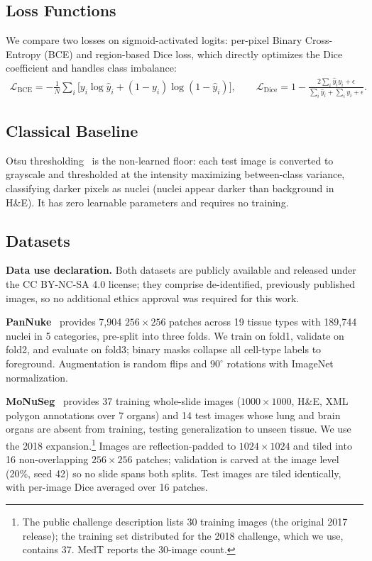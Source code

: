 \documentclass[runningheads]{llncs}
\begin{document}
\subsection{Loss Functions}

We compare two losses on sigmoid-activated logits: per-pixel Binary Cross-Entropy (BCE) and region-based Dice loss, which directly optimizes the Dice coefficient and handles class imbalance:
\begin{align*}
\mathcal{L}_{\text{BCE}} = -\tfrac{1}{N}\textstyle\sum_i \big[y_i \log\hat{y}_i + (1-y_i)\log(1-\hat{y}_i)\big],
\qquad
\mathcal{L}_{\text{Dice}} = 1 - \frac{2\sum_i \hat{y}_i y_i + \epsilon}{\sum_i \hat{y}_i + \sum_i y_i + \epsilon}.
\end{align*}

\subsection{Classical Baseline}

Otsu thresholding~\cite{otsu1979threshold} is the non-learned floor: each test image is converted to grayscale and thresholded at the intensity maximizing between-class variance, classifying darker pixels as nuclei (nuclei appear darker than background in H\&E). It has zero learnable parameters and requires no training.

\subsection{Datasets}
\label{sec:datasets}

\noindent\textbf{Data use declaration.} Both datasets are publicly available and released under the CC BY-NC-SA 4.0 license; they comprise de-identified, previously published images, so no additional ethics approval was required for this work.

\noindent\textbf{PanNuke}~\cite{gamper2019pannuke,gamper2020pannuke_ext} provides 7,904 $256\times256$ patches across 19 tissue types with 189,744 nuclei in 5 categories, pre-split into three folds. We train on fold1, validate on fold2, and evaluate on fold3; binary masks collapse all cell-type labels to foreground. Augmentation is random flips and $90^\circ$ rotations with ImageNet normalization.

\noindent\textbf{MoNuSeg}~\cite{kumar2017monuseg} provides 37 training whole-slide images ($1000\times1000$, H\&E, XML polygon annotations over 7 organs) and 14 test images whose lung and brain organs are absent from training, testing generalization to unseen tissue. We use the 2018 expansion.\footnote{The public challenge description lists 30 training images (the original 2017 release); the training set distributed for the 2018 challenge, which we use, contains 37. MedT reports the 30-image count.} Images are reflection-padded to $1024\times1024$ and tiled into 16 non-overlapping $256\times256$ patches; validation is carved at the image level (20\%, seed 42) so no slide spans both splits. Test images are tiled identically, with per-image Dice averaged over 16 patches.
\end{document}
